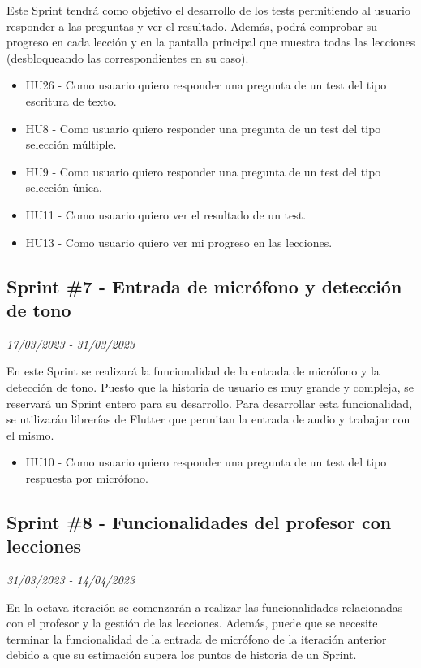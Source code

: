 Este Sprint tendrá como objetivo el desarrollo de los tests permitiendo al usuario responder a las preguntas y ver el resultado.
Además, podrá comprobar su progreso en cada lección y en la pantalla principal que muestra todas las lecciones (desbloqueando las correspondientes en su caso).
\begin{itemize}
    \item HU26 - Como usuario quiero responder una pregunta de un test del tipo escritura de texto.
    \item HU8 - Como usuario quiero responder una pregunta de un test del tipo selección múltiple.
    \item HU9 - Como usuario quiero responder una pregunta de un test del tipo selección única.
    \item HU11 - Como usuario quiero ver el resultado de un test.
    \item HU13 - Como usuario quiero ver mi progreso en las lecciones.

\end{itemize}

\subsection{Sprint \#7 - Entrada de micrófono y detección de tono}
\textit{17/03/2023   -   31/03/2023}

En este Sprint se realizará la funcionalidad de la entrada de micrófono y la detección de tono. Puesto que la historia de usuario es muy grande y compleja, se reservará
un Sprint entero para su desarrollo. Para desarrollar esta funcionalidad, se utilizarán librerías de Flutter que permitan la entrada de audio y trabajar con el mismo.
\begin{itemize}
    \item HU10 - Como usuario quiero responder una pregunta de un test del tipo respuesta por micrófono.
\end{itemize}

\subsection{Sprint \#8 - Funcionalidades del profesor con lecciones}
\textit{31/03/2023   -   14/04/2023}

En la octava iteración se comenzarán a realizar las funcionalidades relacionadas con el profesor y la gestión de las lecciones.
Además, puede que se necesite terminar la funcionalidad de la entrada de micrófono de la iteración anterior debido a que su estimación
supera los puntos de historia de un Sprint.


